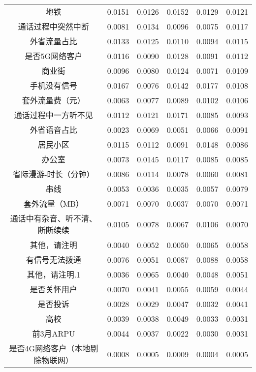 \documentclass{MathorCupmodeling}
\begin{document}
\begin{table}[htbp]
{\begin{tabular}{c|cccc|c}
		  地铁    & 0.0151  & 0.0126  & 0.0152  & 0.0129  & 0.0121  \\
		  通话过程中突然中断 & 0.0081  & 0.0134  & 0.0096  & 0.0075  & 0.0117  \\
		  外省流量占比 & 0.0133  & 0.0125  & 0.0110  & 0.0094  & 0.0115  \\
		  是否5G网络客户 & 0.0116  & 0.0090  & 0.0128  & 0.0091  & 0.0112  \\
		  商业街   & 0.0096  & 0.0080  & 0.0124  & 0.0071  & 0.0109  \\
		  手机没有信号 & 0.0167  & 0.0076  & 0.0142  & 0.0177  & 0.0108  \\
		  套外流量费（元） & 0.0063  & 0.0077  & 0.0089  & 0.0102  & 0.0106  \\
		  通话过程中一方听不见 & 0.0112  & 0.0121  & 0.0171  & 0.0085  & 0.0093  \\
		  外省语音占比 & 0.0023  & 0.0069  & 0.0051  & 0.0066  & 0.0091  \\
		  居民小区  & 0.0115  & 0.0112  & 0.0091  & 0.0148  & 0.0086  \\
		  办公室   & 0.0073  & 0.0145  & 0.0117  & 0.0085  & 0.0085  \\
		  省际漫游-时长（分钟） & 0.0086  & 0.0114  & 0.0078  & 0.0060  & 0.0081  \\
		  串线    & 0.0053  & 0.0036  & 0.0035  & 0.0057  & 0.0079  \\
		  套外流量（MB） & 0.0071  & 0.0070  & 0.0037  & 0.0070  & 0.0071  \\
		  通话中有杂音、听不清、断断续续 & 0.0105  & 0.0078  & 0.0067  & 0.0106  & 0.0070  \\
		  其他，请注明 & 0.0040  & 0.0052  & 0.0050  & 0.0065  & 0.0058  \\
		  有信号无法拨通 & 0.0076  & 0.0051  & 0.0087  & 0.0088  & 0.0058  \\
		  其他，请注明.1 & 0.0036  & 0.0065  & 0.0040  & 0.0048  & 0.0051  \\
		  是否关怀用户 & 0.0070  & 0.0041  & 0.0055  & 0.0059  & 0.0044  \\
		  是否投诉  & 0.0028  & 0.0029  & 0.0047  & 0.0032  & 0.0041  \\
		  高校    & 0.0039  & 0.0038  & 0.0049  & 0.0033  & 0.0031  \\
		  前3月ARPU & 0.0044  & 0.0037  & 0.0022  & 0.0030  & 0.0031  \\
		  是否4G网络客户（本地剔除物联网） & 0.0008  & 0.0005  & 0.0009  & 0.0004  & 0.0005  \\
		  \bottomrule
		  \end{tabular}}
		\label{tab:语音业务影响因素量化}
	\end{table}
\end{document}
